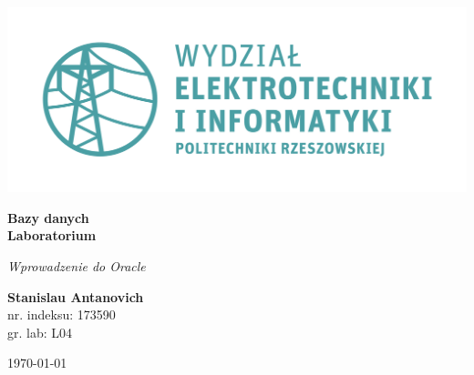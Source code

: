 \documentclass{article}
\begin{document}
\begin{titlepage}
\begin{center}
	\includegraphics[scale=0.7]{logo.png}

	\vspace*{4cm}
	\textbf{Bazy danych\\ Laboratorium}

	\vspace{1.5cm}
	\textit{Wprowadzenie do Oracle}

	\vspace{1.5cm}
	\textbf{Stanislau Antanovich}\\
	nr. indeksu: 173590\\
	gr. lab: L04

	\vspace{4.5cm}
	\today
\end{center}
\end{titlepage}
\end{document}

